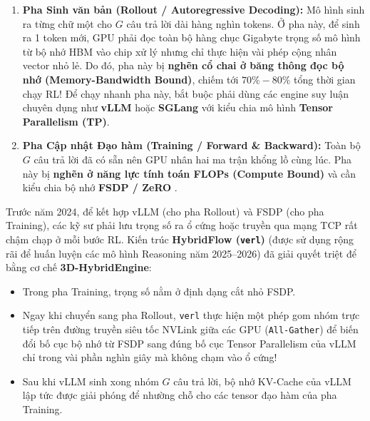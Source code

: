 \begin{enumerate}
  \item \textbf{Pha Sinh văn bản (Rollout / Autoregressive Decoding):} Mô hình sinh ra từng chữ một cho $G$ câu trả lời dài hàng nghìn tokens. Ở pha này, để sinh ra 1 token mới, GPU phải đọc toàn bộ hàng chục Gigabyte trọng số mô hình từ bộ nhớ HBM vào chip xử lý nhưng chỉ thực hiện vài phép cộng nhân vector nhỏ lẻ. Do đó, pha này bị \textbf{nghẽn cổ chai ở băng thông đọc bộ nhớ (Memory-Bandwidth Bound)}, chiếm tới $70\% - 80\%$ tổng thời gian chạy RL! Để chạy nhanh pha này, bắt buộc phải dùng các engine suy luận chuyên dụng như \textbf{vLLM} hoặc \textbf{SGLang} \citep{kwon2023efficient} với kiểu chia mô hình \textbf{Tensor Parallelism (TP)}.
  \item \textbf{Pha Cập nhật Đạo hàm (Training / Forward \& Backward):} Toàn bộ $G$ câu trả lời đã có sẵn nên GPU nhân hai ma trận khổng lồ cùng lúc. Pha này bị \textbf{nghẽn ở năng lực tính toán FLOPs (Compute Bound)} và cần kiểu chia bộ nhớ \textbf{FSDP / ZeRO} \citep{zhao2023pytorch, rajbhandari2020zero}.
\end{enumerate}

\begin{mentalmodel}
Trước năm 2024, để kết hợp vLLM (cho pha Rollout) và FSDP (cho pha Training), các kỹ sư phải lưu trọng số ra ổ cứng hoặc truyền qua mạng TCP rất chậm chạp ở mỗi bước RL.
Kiến trúc \textbf{HybridFlow (\texttt{verl})} \citep{sheng2024hybridflow} (được sử dụng rộng rãi để huấn luyện các mô hình Reasoning năm 2025--2026) đã giải quyết triệt để bằng cơ chế \textbf{3D-HybridEngine}:
\begin{itemize}
  \item Trong pha Training, trọng số nằm ở định dạng cắt nhỏ FSDP.
  \item Ngay khi chuyển sang pha Rollout, \texttt{verl} thực hiện một phép gom nhóm trực tiếp trên đường truyền siêu tốc NVLink giữa các GPU (\texttt{All-Gather}) để biến đổi bố cục bộ nhớ từ FSDP sang đúng bố cục Tensor Parallelism của vLLM chỉ trong vài phần nghìn giây mà không chạm vào ổ cứng!
  \item Sau khi vLLM sinh xong nhóm $G$ câu trả lời, bộ nhớ KV-Cache của vLLM lập tức được giải phóng để nhường chỗ cho các tensor đạo hàm của pha Training.
\end{itemize}
\end{mentalmodel}

